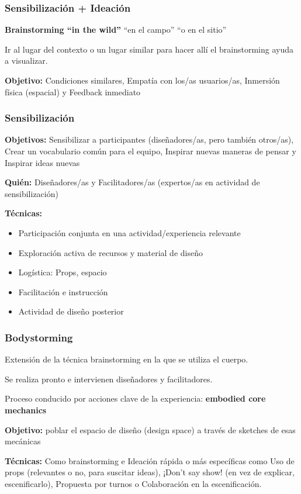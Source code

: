 \documentclass[12pt, twoside, openright]{report} %
\begin{document}
\subsubsection{Sensibilización + Ideación}
\textbf{Brainstorming “in the wild”} “en el campo” “o en el sitio”

Ir al lugar del contexto o un lugar similar para hacer allí el brainstorming ayuda a visualizar.

\textbf{Objetivo:} Condiciones similares, Empatía con los/as usuarios/as, Inmersión física (espacial) y Feedback inmediato
\pagebreak
\subsubsection{Sensibilización}
\textbf{Objetivos:} Sensibilizar a participantes (diseñadores/as, pero también otros/as), Crear un vocabulario común para el equipo, Inspirar nuevas maneras de pensar y Inspirar ideas nuevas

\textbf{Quién:} Diseñadores/as y Facilitadores/as (expertos/as en actividad de sensibilización)

\textbf{Técnicas:}
\begin{itemize}
  \item Participación conjunta en una actividad/experiencia relevante
  \item Exploración activa de recursos y material de diseño
  \item Logística: Props, espacio
  \item Facilitación e instrucción
  \item Actividad de diseño posterior
\end{itemize}

\subsubsection{Bodystorming}

Extensión de la técnica brainstorming en la que se utiliza el cuerpo. 

Se realiza pronto e intervienen diseñadores y facilitadores.

Proceso conducido por acciones clave de la experiencia: \textbf{embodied core mechanics}

\textbf{Objetivo:} poblar el espacio de diseño (design space) a través de sketches de esas mecánicas

\textbf{Técnicas:} Como brainstorming e Ideación rápida o más específicas como Uso de props (relevantes o no, para suscitar ideas), ¡Don’t say show! (en vez de explicar, escenificarlo), Propuesta por turnos o Colaboración en la escenificación.
\end{document}
